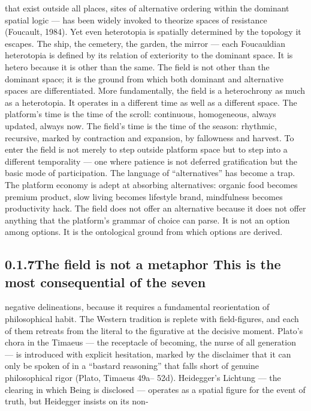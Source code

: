 that exist outside all places, sites of alternative ordering within the dominant spatial logic — has been widely invoked to theorize spaces of resistance (Foucault, 1984). Yet even heterotopia is spatially determined by the topology it escapes. The ship, the cemetery, the garden, the mirror — each Foucauldian heterotopia is defined by its relation of exteriority to the dominant space. It is hetero because it is other than the same. The field is not other than the dominant space; it is the ground from which both dominant and alternative spaces are differentiated. More fundamentally, the field is a heterochrony as much as a heterotopia. It operates in a different time as well as a different space. The platform’s time is the time of the scroll: continuous, homogeneous, always updated, always now. The field’s time is the time of the season: rhythmic, recursive, marked by contraction and expansion, by fallowness and harvest. To enter the field is not merely to step outside platform space but to step into a different temporality — one where patience is not deferred gratification but the basic mode of participation. The language of “alternatives” has become a trap. The platform economy is adept at absorbing alternatives: organic food becomes premium product, slow living becomes lifestyle brand, mindfulness becomes productivity hack. The field does not offer an alternative because it does not offer anything that the platform’s grammar of choice can parse. It is not an option among options. It is the ontological ground from which options are derived.

\subsection{0.1.7\quad The field is not a metaphor This is the most consequential of the seven}

negative delineations, because it requires a fundamental reorientation of philosophical habit. The Western tradition is replete with field-figures, and each of them retreats from the literal to the figurative at the decisive moment. Plato’s chora in the Timaeus — the receptacle of becoming, the nurse of all generation — is introduced with explicit hesitation, marked by the disclaimer that it can only be spoken of in a “bastard reasoning” that falls short of genuine philosophical rigor (Plato, Timaeus 49a– 52d). Heidegger’s Lichtung — the clearing in which Being is disclosed — operates as a spatial figure for the event of truth, but Heidegger insists on its non-

